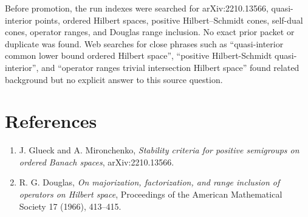 \documentclass[11pt]{article}
\begin{document}
Before promotion, the run indexes were searched for arXiv:2210.13566, quasi-interior points, ordered Hilbert spaces, positive Hilbert--Schmidt cones, self-dual cones, operator ranges, and Douglas range inclusion.  No exact prior packet or duplicate was found.  Web searches for close phrases such as ``quasi-interior common lower bound ordered Hilbert space'', ``positive Hilbert-Schmidt quasi-interior'', and ``operator ranges trivial intersection Hilbert space'' found related background but no explicit answer to this source question.

\section*{References}

\begin{enumerate}
    \item J. Glueck and A. Mironchenko, \emph{Stability criteria for positive semigroups on ordered Banach spaces}, arXiv:2210.13566.
    \item R. G. Douglas, \emph{On majorization, factorization, and range inclusion of operators on Hilbert space}, Proceedings of the American Mathematical Society 17 (1966), 413--415.
\end{enumerate}
\end{document}

